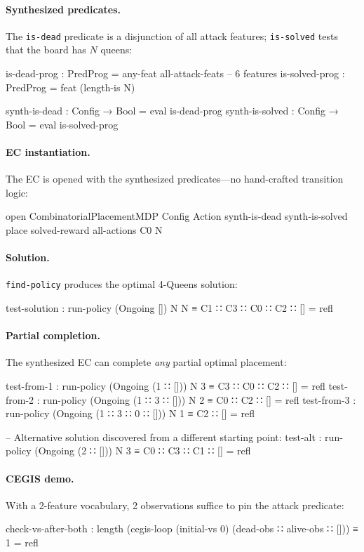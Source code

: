 \documentclass[9pt,a4paper]{article}
\theoremstyle{plain}
\theoremstyle{definition}
\theoremstyle{remark}
\begin{document}
\paragraph{Synthesized predicates.}  The \texttt{is-dead} predicate is a disjunction of all attack features; \texttt{is-solved} tests that the board has $N$ queens:
\begin{spec}
is-dead-prog   : PredProg = any-feat all-attack-feats    -- 6 features
is-solved-prog : PredProg = feat (length-is N)

synth-is-dead   : Config → Bool = eval is-dead-prog
synth-is-solved : Config → Bool = eval is-solved-prog
\end{spec}

\paragraph{EC instantiation.}  The EC is opened with the synthesized predicates---no hand-crafted transition logic:
\begin{spec}
open CombinatorialPlacementMDP Config Action
  synth-is-dead synth-is-solved place solved-reward all-actions C0 N
\end{spec}

\paragraph{Solution.}  \texttt{find-policy} produces the optimal 4-Queens solution:
\begin{spec}
test-solution : run-policy (Ongoing []) N N ≡ C1 ∷ C3 ∷ C0 ∷ C2 ∷ []  = refl
\end{spec}

\paragraph{Partial completion.}  The synthesized EC can complete \emph{any} partial optimal placement:
\begin{spec}
test-from-1 : run-policy (Ongoing (1 ∷ [])) N 3 ≡ C3 ∷ C0 ∷ C2 ∷ []  = refl
test-from-2 : run-policy (Ongoing (1 ∷ 3 ∷ [])) N 2 ≡ C0 ∷ C2 ∷ []   = refl
test-from-3 : run-policy (Ongoing (1 ∷ 3 ∷ 0 ∷ [])) N 1 ≡ C2 ∷ []    = refl

-- Alternative solution discovered from a different starting point:
test-alt : run-policy (Ongoing (2 ∷ [])) N 3 ≡ C0 ∷ C3 ∷ C1 ∷ []     = refl
\end{spec}

\paragraph{CEGIS demo.}  With a 2-feature vocabulary, 2 observations suffice to pin the attack predicate:
\begin{spec}
check-vs-after-both :
  length (cegis-loop (initial-vs 0) (dead-obs ∷ alive-obs ∷ [])) ≡ 1  = refl
\end{spec}
\end{document}

